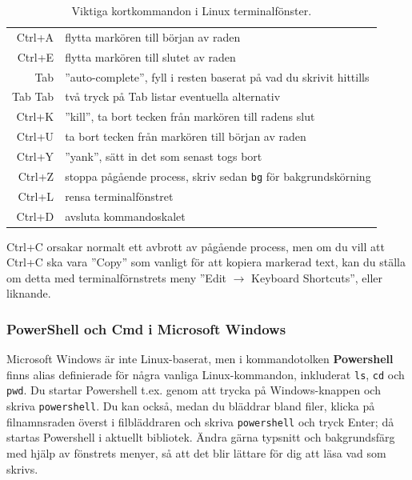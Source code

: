 \begin{table}[H]
\renewcommand{\arraystretch}{1.15}
\begin{tabular}{@{}r | l}
Ctrl+A & flytta markören till början av raden \\
Ctrl+E & flytta markören till slutet av raden \\
Tab & ''auto-complete'', fyll i resten baserat på vad du skrivit hittills \\
Tab Tab & två tryck på Tab listar eventuella alternativ \\
Ctrl+K & ''kill'', ta bort tecken från markören till radens slut\\
Ctrl+U & ta bort tecken från markören till början av raden \\
Ctrl+Y & ''yank'', sätt in det som senast togs bort\\
Ctrl+Z & stoppa pågående process, skriv sedan \texttt{bg} för bakgrundskörning\\
Ctrl+L & rensa terminalfönstret\\
Ctrl+D & avsluta kommandoskalet \\
\end{tabular}
    \caption{Viktiga kortkommandon i Linux terminalfönster.}
    \label{fig:terminal:shortcuts}
\end{table}

\noindent Ctrl+C orsakar normalt ett avbrott av pågående process, men om du vill att Ctrl+C ska vara ''Copy'' som vanligt för att kopiera markerad text, kan du ställa om detta med terminalförnstrets  meny ''Edit $\rightarrow$ Keyboard Shortcuts'', eller liknande.




 
\subsubsection{PowerShell och Cmd i Microsoft Windows}
Microsoft Windows är inte Linux-baserat, men i kommandotolken \textbf{Powershell} finns alias definierade för några vanliga Linux-kommandon, inkluderat \texttt{ls}, \texttt{cd} och \texttt{pwd}. 
Du startar Powershell t.ex. genom att trycka på Windows-knappen och skriva \texttt{powershell}. 
Du kan också, medan du bläddrar bland filer, klicka på filnamnsraden överst i filbläddraren och skriva \texttt{powershell} och tryck Enter; då startas Powershell i aktuellt bibliotek. Ändra gärna typsnitt och bakgrundsfärg med hjälp av fönstrets menyer, så att det blir lättare för dig att läsa vad som skrivs.

